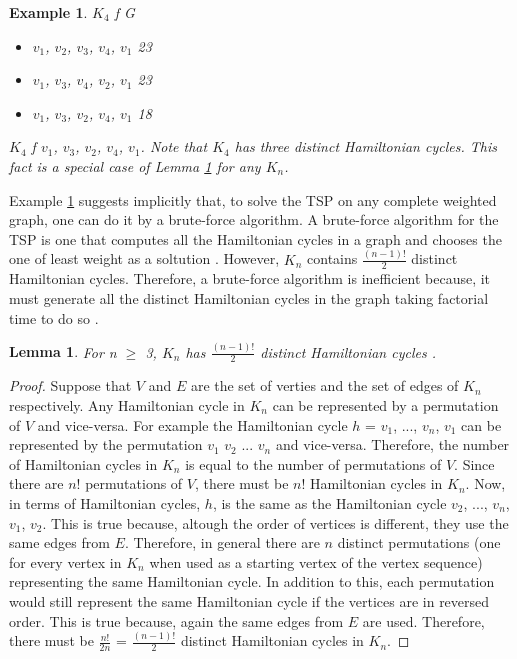 \documentclass{article}
\newtheorem{lemma}[definition]{Lemma}
\newtheorem{example}[definition]{Example}
\begin{document}
\begin{example}
\label{example_2.1}
{} $K_4$ {} f {} G {}
\begin{itemize}
   \item $v_1$, $v_2$, $v_3$, $v_4$, $v_1$ {} 23
   \item $v_1$, $v_3$, $v_4$, $v_2$, $v_1$ {} 23
   \item $v_1$, $v_3$, $v_2$, $v_4$, $v_1$ {} 18
\end{itemize} 
{} $K_4$ {} f {} $v_1$, $v_3$, $v_2$, $v_4$, $v_1$. Note that $K_4$ has three distinct Hamiltonian cycles. This fact is a special case of Lemma \ref{distinct_hamiltonian_cycles} for any $K_n$. 
\end{example}
Example \ref{example_2.1} suggests implicitly that, to solve the TSP on any complete weighted graph, one can do it by a brute-force algorithm. A brute-force algorithm for the TSP is one that computes all the Hamiltonian cycles in a graph and chooses the one of least weight as a soltution \cite{Sanchit}. However, $\mathit{K_n}$ contains $\mathit{\frac{(n-1)!}{2}}$ distinct Hamiltonian cycles. Therefore, a brute-force algorithm is inefficient because, it must generate all the distinct Hamiltonian cycles in the graph taking factorial time to do so \cite{Sanchit}. 
\begin{lemma}
\label{distinct_hamiltonian_cycles}
For n $\geq$ 3, $K_n$ has $\frac{(n-1)!}{2}$ distinct Hamiltonian cycles \cite{mathematics_stack_exchange_2012}. 
\end{lemma}
\begin{proof}
Suppose that $V$ and $E$ are the set of verties and the set of edges of $K_n$ respectively. Any Hamiltonian cycle in $K_n$ can be represented by a permutation of $V$ and vice-versa. For example the Hamiltonian cycle $h$ = $v_1$, ..., $v_n$, $v_1$ can be represented by the permutation $v_1$ $v_2$ ... $v_n$ and vice-versa. Therefore, the number of Hamiltonian cycles in $K_n$ is equal to the number of permutations of $V$. Since there are $n!$ permutations of $V$, there must be $n!$ Hamiltonian cycles in $K_n$. Now, in terms of Hamiltonian cycles, $h$, is the same as the Hamiltonian cycle $v_2$, ..., $v_n$, $v_1$, $v_2$. This is true because, altough the order of vertices is different, they use the same edges from $E$. Therefore, in general there are $n$ distinct permutations (one for every vertex in $K_n$ when used as a starting vertex of the vertex sequence) representing the same Hamiltonian cycle. In addition to this, each permutation would still represent the same Hamiltonian cycle if the vertices are in reversed order. This is true because, again the same edges from $E$ are used. Therefore, there must be $\frac{n!}{2n}$ = $\frac{(n-1)!}{2}$ distinct Hamiltonian cycles in $K_n$.
\end{proof}
\end{document}
